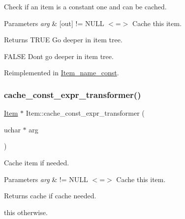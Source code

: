 Check if an item is a constant one and can be cached.


\begin{DoxyParams}{Parameters}
{\em arg} & \mbox{[}out\mbox{]} != N\+U\+LL $<$=$>$ Cache this item.\\
\hline
\end{DoxyParams}
\begin{DoxyReturn}{Returns}
T\+R\+UE Go deeper in item tree. 

F\+A\+L\+SE Don\textquotesingle{}t go deeper in item tree. 
\end{DoxyReturn}


Reimplemented in \mbox{\hyperlink{classItem__name__const_aa6f5f451a1c2fc81670502605ae1cffc}{Item\+\_\+name\+\_\+const}}.

\mbox{\label{classItem_a4ce0aa0716b2a6b5b29c6c455d0d76db}} 
\subsubsection{\texorpdfstring{cache\+\_\+const\+\_\+expr\+\_\+transformer()}{cache\_const\_expr\_transformer()}}
{\footnotesize\ttfamily \mbox{\hyperlink{classItem}{Item}} $\ast$ Item\+::cache\+\_\+const\+\_\+expr\+\_\+transformer (\begin{DoxyParamCaption}\item[{uchar $\ast$}]{arg }\end{DoxyParamCaption})\hspace{0.3cm}{\ttfamily [virtual]}}

Cache item if needed.


\begin{DoxyParams}{Parameters}
{\em arg} & != N\+U\+LL $<$=$>$ Cache this item.\\
\hline
\end{DoxyParams}
\begin{DoxyReturn}{Returns}
cache if cache needed. 

this otherwise. 
\end{DoxyReturn}
\mbox{\label{classItem_a714b4a2e3278f84b2ddb9e65c7fddaff}} 
